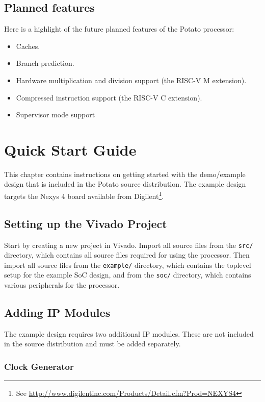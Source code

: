\documentclass[12pt,a4paper]{report}
\begin{document}
\section{Planned features}
Here is a highlight of the future planned features of the Potato processor:

\begin{itemize}
\item Caches.
\item Branch prediction.
\item Hardware multiplication and division support (the RISC-V M extension).
\item Compressed instruction support (the RISC-V C extension).
\item Supervisor mode support
\end{itemize}

\chapter{Quick Start Guide}
\label{cha:quickstart}

This chapter contains instructions on getting started with the demo/example design that is
included in the Potato source distribution. The example design targets the Nexys 4 board
available from Digilent\footnote{See \url{http://www.digilentinc.com/Products/Detail.cfm?Prod=NEXYS4}}.

\section{Setting up the Vivado Project}

Start by creating a new project in Vivado. Import all source files from the \texttt{src/} directory,
which contains all source files required for using the processor. Then import all source files from
the \texttt{example/} directory, which contains the toplevel setup for the example SoC design,
and from the \texttt{soc/} directory, which contains various peripherals for the processor.

\section{Adding IP Modules}

The example design requires two additional IP modules. These are not included in the source
distribution and must be added separately.

\subsection{Clock Generator}
\end{document}
